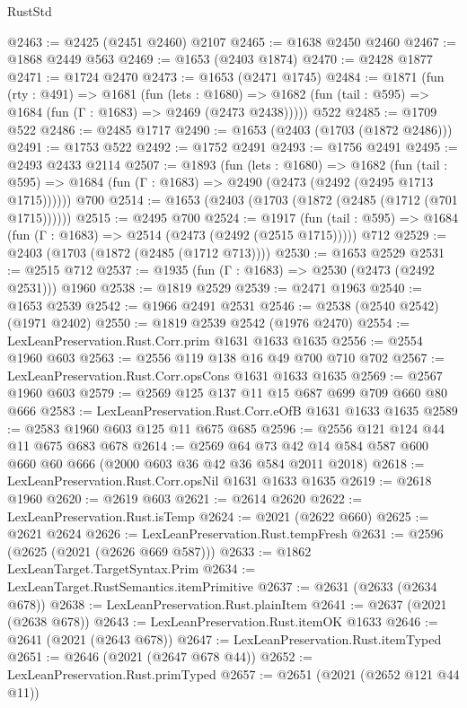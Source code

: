 \begin{lexlean}{RustStd}
\begin{coremodule}
@2463 := @2425 (@2451 @2460) @2107
@2465 := @1638 @2450 @2460
@2467 := @1868 @2449 @563
@2469 := @1653 (@2403 @1874)
@2470 := @2428 @1877
@2471 := @1724 @2470
@2473 := @1653 (@2471 @1745)
@2484 := @1871
    (fun (rty : @491) =>
    @1681
      (fun (lets : @1680) =>
      @1682 (fun (tail : @595) => @1684 (fun (Γ : @1683) => @2469 (@2473 @2438)))))
    @522
@2485 := @1709 @522
@2486 := @2485 @1717
@2490 := @1653 (@2403 (@1703 (@1872 @2486)))
@2491 := @1753 @522
@2492 := @1752 @2491
@2493 := @1756 @2491
@2495 := @2493 @2433 @2114
@2507 := @1893
    (fun (lets : @1680) =>
    @1682
      (fun (tail : @595) => @1684 (fun (Γ : @1683) => @2490 (@2473 (@2492 (@2495 @1713 @1715))))))
    @700
@2514 := @1653 (@2403 (@1703 (@1872 (@2485 (@1712 (@701 @1715))))))
@2515 := @2495 @700
@2524 := @1917
    (fun (tail : @595) => @1684 (fun (Γ : @1683) => @2514 (@2473 (@2492 (@2515 @1715)))))
    @712
@2529 := @2403 (@1703 (@1872 (@2485 (@1712 @713))))
@2530 := @1653 @2529
@2531 := @2515 @712
@2537 := @1935 (fun (Γ : @1683) => @2530 (@2473 (@2492 @2531))) @1960
@2538 := @1819 @2529
@2539 := @2471 @1963
@2540 := @1653 @2539
@2542 := @1966 @2491 @2531
@2546 := @2538 (@2540 @2542) (@1971 @2402)
@2550 := @1819 @2539 @2542 (@1976 @2470)
@2554 := LexLeanPreservation.Rust.Corr.prim @1631 @1633 @1635
@2556 := @2554 @1960 @603
@2563 := @2556 @119 @138 @16 @49 @700 @710 @702
@2567 := LexLeanPreservation.Rust.Corr.opsCons @1631 @1633 @1635
@2569 := @2567 @1960 @603
@2579 := @2569 @125 @137 @11 @15 @687 @699 @709 @660 @80 @666
@2583 := LexLeanPreservation.Rust.Corr.eOfB @1631 @1633 @1635
@2589 := @2583 @1960 @603 @125 @11 @675 @685
@2596 := @2556 @121 @124 @44 @11 @675 @683 @678
@2614 := @2569
    @64
    @73
    @42
    @14
    @584
    @587
    @600
    @660
    @60
    @666
    (@2000 @603 @36 @42 @36 @584 @2011 @2018)
@2618 := LexLeanPreservation.Rust.Corr.opsNil @1631 @1633 @1635
@2619 := @2618 @1960
@2620 := @2619 @603
@2621 := @2614 @2620
@2622 := LexLeanPreservation.Rust.isTemp
@2624 := @2021 (@2622 @660)
@2625 := @2621 @2624
@2626 := LexLeanPreservation.Rust.tempFresh
@2631 := @2596 (@2625 (@2021 (@2626 @669 @587)))
@2633 := @1862 LexLeanTarget.TargetSyntax.Prim
@2634 := LexLeanTarget.RustSemantics.itemPrimitive
@2637 := @2631 (@2633 (@2634 @678))
@2638 := LexLeanPreservation.Rust.plainItem
@2641 := @2637 (@2021 (@2638 @678))
@2643 := LexLeanPreservation.Rust.itemOK @1633
@2646 := @2641 (@2021 (@2643 @678))
@2647 := LexLeanPreservation.Rust.itemTyped
@2651 := @2646 (@2021 (@2647 @678 @44))
@2652 := LexLeanPreservation.Rust.primTyped
@2657 := @2651 (@2021 (@2652 @121 @44 @11))

\end{coremodule}
\end{lexlean}
